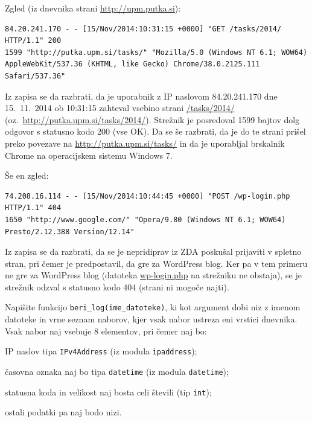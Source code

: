 \documentclass[arhiv]{../izpit}
\begin{document}
\noindent Zgled (iz dnevnika strani \url{http://upm.putka.si}):

\begin{verbatim}
84.20.241.170 - - [15/Nov/2014:10:31:15 +0000] "GET /tasks/2014/ HTTP/1.1" 200
1599 "http://putka.upm.si/tasks/" "Mozilla/5.0 (Windows NT 6.1; WOW64)
AppleWebKit/537.36 (KHTML, like Gecko) Chrome/38.0.2125.111 Safari/537.36"
\end{verbatim}

\noindent Iz zapisa se da razbrati, da je uporabnik z IP naslovom 84.20.241.170 dne 15.\ 11.\ 2014 ob 10:31:15 zahteval vsebino strani \url{/tasks/2014/} (oz.\ \url{http://putka.upm.si/tasks/2014/}). Strežnik je posredoval 1599 bajtov dolg odgovor s statusno kodo 200 (vse OK). Da se še razbrati, da je do te strani prišel preko povezave na \url{http://putka.upm.si/tasks/} in da je uporabljal brskalnik Chrome na operacijskem sistemu Windows 7.

\vspace{0.5\baselineskip}
\noindent Še en zgled:

\begin{verbatim}
74.208.16.114 - - [15/Nov/2014:10:44:45 +0000] "POST /wp-login.php HTTP/1.1" 404
1650 "http://www.google.com/" "Opera/9.80 (Windows NT 6.1; WOW64)
Presto/2.12.388 Version/12.14"
\end{verbatim}

\noindent Iz zapisa se da razbrati, da se je nepridiprav iz ZDA poskušal prijaviti v spletno stran, pri čemer je predpostavil, da gre za WordPress blog.
Ker pa v tem primeru ne gre za WordPress blog (datoteka \url{wp-login.php} na strežniku ne obstaja),
se je strežnik odzval s statusno kodo 404 (strani ni mogoče najti).


\podnaloga[15 točk]
Napišite funkcijo \texttt{beri\_log(ime\_datoteke)}, ki kot argument dobi niz z imenom datoteke in vrne seznam naborov, kjer vsak nabor ustreza eni vrstici dnevnika. Vsak nabor naj vsebuje 8 elementov, pri čemer naj bo:
\begin{compactitem}
\item IP naslov tipa \texttt{IPv4Address} (iz modula \texttt{ipaddress});
\item časovna oznaka naj bo tipa \texttt{datetime} (iz modula \texttt{datetime});
\item statusna koda in velikost naj bosta celi števili (tip \texttt{int});
\item ostali podatki pa naj bodo nizi.
\end{compactitem}
\end{document}
